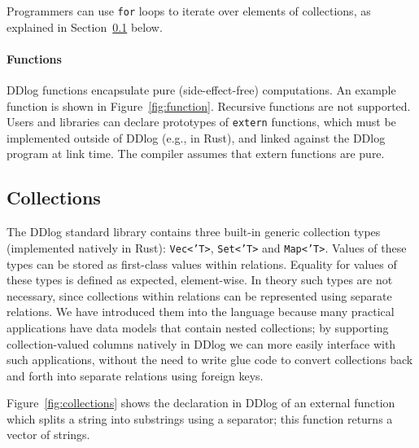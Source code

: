 Programmers can use \texttt{for} loops to iterate over elements of
collections, as explained in Section~\ref{sec:collections} below.

\paragraph{Functions}

DDlog functions encapsulate pure (side-effect-free) computations.
An example function is shown in
Figure~\ref{fig:function}.  Recursive functions are not supported.
Users and libraries can declare prototypes of \texttt{extern}
functions, which must be implemented outside of DDlog (e.g., in Rust),
and linked against the DDlog program at link time.  The compiler
assumes that extern functions are pure.

\subsection{Collections}\label{sec:collections}

The DDlog standard library contains three built-in generic collection
types (implemented natively in Rust): \texttt{Vec<'T>},
\texttt{Set<'T>} and \texttt{Map<'T>}.  Values of these types can be
stored as first-class values within relations.  Equality for values
of these types is defined as expected, element-wise.  In theory such
types are not necessary, since collections within relations can be
represented using separate relations.  We have
introduced them into the language because many practical applications
have data models that contain nested collections; by supporting
collection-valued columns natively in DDlog we can more easily
interface with such applications, without the need to write glue code
to convert collections back and forth into separate relations using
foreign keys.

Figure~\ref{fig:collections} shows the declaration in DDlog of an
external function which splits a string into substrings using a
separator; this function returns a vector of strings.

